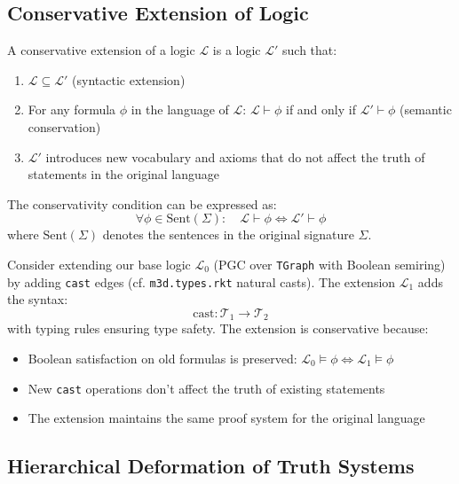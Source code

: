 \subsection{Conservative Extension of Logic}

\begin{definition}
\label{def:conservative-extension}
A conservative extension of a logic $\mathcal{L}$ is a logic $\mathcal{L}'$ such that:
\begin{enumerate}
\item $\mathcal{L} \subseteq \mathcal{L}'$ (syntactic extension)
\item For any formula $\phi$ in the language of $\mathcal{L}$: $\mathcal{L} \vdash \phi$ if and only if $\mathcal{L}' \vdash \phi$ (semantic conservation)
\item $\mathcal{L}'$ introduces new vocabulary and axioms that do not affect the truth of statements in the original language
\end{enumerate}
The conservativity condition can be expressed as:
\[
\forall \phi \in \text{Sent}(\Sigma): \quad \mathcal{L} \vdash \phi \Leftrightarrow \mathcal{L}' \vdash \phi
\]
where $\text{Sent}(\Sigma)$ denotes the sentences in the original signature $\Sigma$.
\end{definition}

\begin{example}
\label{ex:conservative-extension}
Consider extending our base logic $\mathcal{L}_0$ (PGC over \texttt{TGraph} with Boolean semiring) by adding \texttt{cast} edges (cf. \texttt{m3d.types.rkt} natural casts). The extension $\mathcal{L}_1$ adds the syntax:
\[
\text{cast}: \mathcal{T}_1 \to \mathcal{T}_2
\]
with typing rules ensuring type safety. The extension is conservative because:
\begin{itemize}
\item Boolean satisfaction on old formulas is preserved: $\mathcal{L}_0 \models \phi \Leftrightarrow \mathcal{L}_1 \models \phi$
\item New \texttt{cast} operations don't affect the truth of existing statements
\item The extension maintains the same proof system for the original language
\end{itemize}
\end{example}

\subsection{Hierarchical Deformation of Truth Systems}

